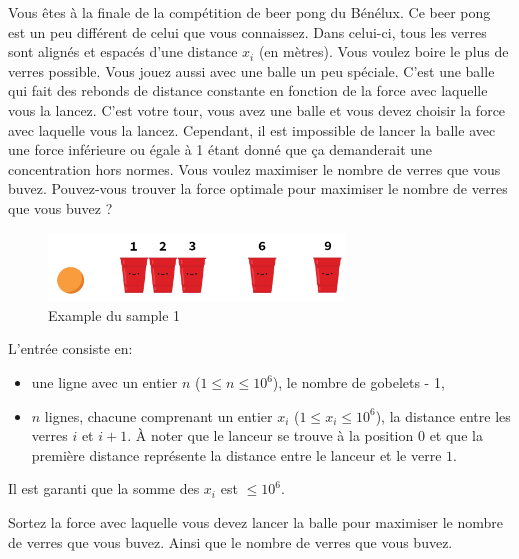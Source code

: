 \problemname{\problemyamlname}


\newcommand{\maxn}{10^{6}}

Vous êtes à la finale de la compétition de beer pong du Bénélux. Ce beer pong est un peu différent de celui que vous connaissez. Dans celui-ci, tous les verres sont alignés et espacés d'une distance $x_i$ (en mètres). Vous voulez boire le plus de verres possible. Vous jouez aussi avec une balle un peu spéciale. C'est une balle qui fait des rebonds de distance constante en fonction de la force avec laquelle vous la lancez.
C'est votre tour, vous avez une balle et vous devez choisir la force avec laquelle vous la lancez. Cependant, il est impossible de lancer la balle avec une force inférieure ou égale à 1 étant donné que ça demanderait une concentration hors normes. Vous voulez maximiser le nombre de verres que vous buvez. Pouvez-vous trouver la force optimale pour maximiser le nombre de verres que vous buvez ?
\smallskip
\begin{figure}[h]
    \centering
    \includegraphics[width=0.7\textwidth]{illustration.png}
    \caption{Example du sample 1}
\end{figure}

\begin{Input}
    L'entrée consiste en:
    \begin{itemize}
        \item une ligne avec un entier  $n$ ($1\leq n\leq \maxn$), le nombre de gobelets - 1,
        \item $n$ lignes, chacune comprenant un entier $x_i$ ($1\leq x_i\leq \maxn$), la distance entre les verres $i$ et $i+1$. À noter que le lanceur se trouve à la position $0$ et que la première distance représente la distance entre le lanceur et le verre $1$.
    \end{itemize}
    Il est garanti que la somme des $x_i$ est $\leq 10^6$.
\end{Input}

\begin{Output}
    Sortez la force avec laquelle vous devez lancer la balle pour maximiser le nombre de verres que vous buvez. Ainsi que le nombre de verres que vous buvez.
\end{Output}

